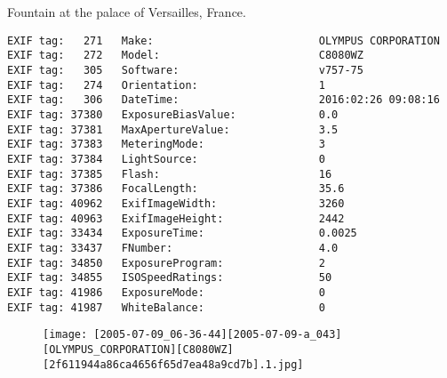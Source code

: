\section{\protect{}}
\noindent Fountain at the palace of Versailles, France.
\noindent
\begin{lstlisting}
EXIF tag:   271   Make:                          OLYMPUS CORPORATION
EXIF tag:   272   Model:                         C8080WZ
EXIF tag:   305   Software:                      v757-75
EXIF tag:   274   Orientation:                   1
EXIF tag:   306   DateTime:                      2016:02:26 09:08:16
EXIF tag: 37380   ExposureBiasValue:             0.0
EXIF tag: 37381   MaxApertureValue:              3.5
EXIF tag: 37383   MeteringMode:                  3
EXIF tag: 37384   LightSource:                   0
EXIF tag: 37385   Flash:                         16
EXIF tag: 37386   FocalLength:                   35.6
EXIF tag: 40962   ExifImageWidth:                3260
EXIF tag: 40963   ExifImageHeight:               2442
EXIF tag: 33434   ExposureTime:                  0.0025
EXIF tag: 33437   FNumber:                       4.0
EXIF tag: 34850   ExposureProgram:               2
EXIF tag: 34855   ISOSpeedRatings:               50
EXIF tag: 41986   ExposureMode:                  0
EXIF tag: 41987   WhiteBalance:                  0

\end{lstlisting}
\clearpage
\begin{figure}
\raggedleft
\texttt{[image: [2005-07-09\_06-36-44][2005-07-09-a\_043][OLYMPUS\_CORPORATION][C8080WZ][2f611944a86ca4656f65d7ea48a9cd7b].1.jpg]}
\end{figure}


\clearpage
